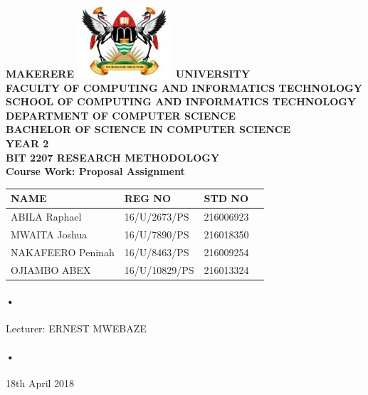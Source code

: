 \documentclass[12pt]{article}
\begin{document}
\begin{Huge}
\begin{center}
\begin{normalsize}
\textbf{MAKERERE \includegraphics[scale=0.5]{logo} UNIVERSITY }\\


\textbf{FACULTY OF COMPUTING AND INFORMATICS TECHNOLOGY} \\
\textbf{SCHOOL OF COMPUTING AND INFORMATICS TECHNOLOGY} \\
\textbf{DEPARTMENT OF COMPUTER SCIENCE} \\
\textbf{BACHELOR OF SCIENCE IN COMPUTER SCIENCE} \\
\textbf{YEAR 2} \\
\textbf{BIT 2207 RESEARCH METHODOLOGY} \\
\textbf{Course Work: Proposal Assignment }\\
\end{normalsize}
\end{center}
\end{Huge}

\begin{center}
\begin{tabular}{|l|l|l|c|}
\hline NAME  & REG NO & STD NO \\\hline

ABILA Raphael& 16/U/2673/PS & 216006923 \\\hline
MWAITA Joshua& 16/U/7890/PS & 216018350 \\\hline
NAKAFEERO Peninah&16/U/8463/PS & 216009254 \\\hline
OJIAMBO ABEX     & 16/U/10829/PS & 216013324 \\\hline
\end{tabular}
\paragraph{•}
Lecturer: ERNEST MWEBAZE \\
\paragraph{•}
18th April 2018

\end{center}
\end{document}
